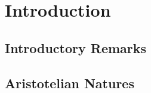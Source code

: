 \def\mychapter{I}

\chapter{Introduction}\label{ch:intro}
\section{Introductory Remarks}
\section{Aristotelian Natures}
\chaptertail 

